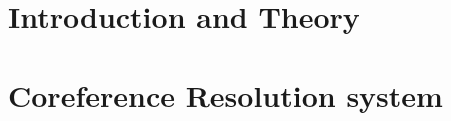 \documentclass[12pt,a4paper,bibtotoc,idxtotoc,headsepline,footsepline,footexclude,BCOR12mm,DIV13]{scrbook}
\begin{document}
	\frontmatter
	
	
	
%	
%	
	
	
%	
	\clearemptydoublepage
	
	
	
	
	
	


	
   
	\mainmatter
		
	
		
	
		\tableofcontents
	
	
		\part[Introduction and Theory]{Introduction and Theory}
		\label{part:introAndBackgroundTheory}
		
		
		
		\part[Coreference Resolution]{Coreference Resolution system }
		\label{part:secondP}
		
		
		
		
		
		
		
		
		\listoftables
		\newpage
		\listoffigures
	

	
  \clearemptydoublepage
 
	
	
	
 
\end{document}
